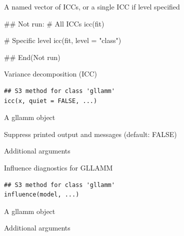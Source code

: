 \documentclass[a4paper]{book}
\begin{document}
%
\begin{Value}
A named vector of ICCs, or a single ICC if level specified
\end{Value}
%
\begin{Examples}
\begin{ExampleCode}
## Not run: 
# All ICCs
icc(fit)

# Specific level
icc(fit, level = "class")

## End(Not run)

\end{ExampleCode}
\end{Examples}
%
\begin{Description}
Variance decomposition (ICC)
\end{Description}
%
\begin{Usage}
\begin{verbatim}
## S3 method for class 'gllamm'
icc(x, quiet = FALSE, ...)
\end{verbatim}
\end{Usage}
%
\begin{Arguments}
\begin{ldescription}
\item[\code{x}] A gllamm object

\item[\code{quiet}] Suppress printed output and messages (default: FALSE)

\item[\code{...}] Additional arguments
\end{ldescription}
\end{Arguments}
%
\begin{Description}
Influence diagnostics for GLLAMM
\end{Description}
%
\begin{Usage}
\begin{verbatim}
## S3 method for class 'gllamm'
influence(model, ...)
\end{verbatim}
\end{Usage}
%
\begin{Arguments}
\begin{ldescription}
\item[\code{model}] A gllamm object

\item[\code{...}] Additional arguments
\end{ldescription}
\end{Arguments}
\end{document}
